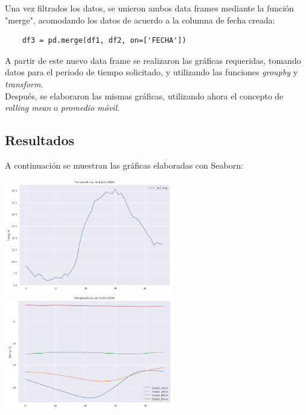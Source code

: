 \documentclass[letterpaper,12pt]{article}
\begin{document}
Una vez filtrados los datos, se unieron ambos data frames mediante la función "merge", acomodando los datos de acuerdo a la columna de fecha creada:

\begin{verbatim}
    df3 = pd.merge(df1, df2, on=['FECHA'])
\end{verbatim}

A partir de este nuevo data frame se realizaron las gráficas requeridas, tomando datos para el periodo de tiempo solicitado, y utilizando las funciones \emph{groupby} y \emph{transform}.
\\
Después, se elaboraron las mismas gráficas, utilizando ahora el concepto de \emph{rolling mean} o \emph{promedio móvil}. 

\subsection{Resultados}
A continuación se muestran las gráficas elaboradas con Seaborn:

\begin{center}
	\includegraphics[height=5cm]{Tairundia.png}\hspace*{\fill}
	\label{graf1}
   \includegraphics[height=5cm]{Tsueloundia.png}
    \label{graf2}
\end{center}
\end{document}
